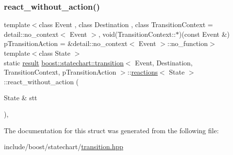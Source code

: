 \subsubsection{\texorpdfstring{react\+\_\+without\+\_\+action()}{react\_without\_action()}}
{\footnotesize\ttfamily template$<$class Event , class Destination , class Transition\+Context  = detail\+::no\+\_\+context$<$ Event $>$, void(\+Transition\+Context\+::$\ast$)(const Event \&) p\+Transition\+Action = \&detail\+::no\+\_\+context$<$ Event $>$\+::no\+\_\+function$>$ \\
template$<$class State $>$ \\
static \mbox{\hyperlink{namespaceboost_1_1statechart_abe807f6598b614d6d87bb951ecd92331}{result}} \mbox{\hyperlink{classboost_1_1statechart_1_1transition}{boost\+::statechart\+::transition}}$<$ Event, Destination, Transition\+Context, p\+Transition\+Action $>$\+::\mbox{\hyperlink{structboost_1_1statechart_1_1transition_1_1reactions}{reactions}}$<$ State $>$\+::react\+\_\+without\+\_\+action (\begin{DoxyParamCaption}\item[{State \&}]{stt }\end{DoxyParamCaption})\hspace{0.3cm}{\ttfamily [inline]}, {\ttfamily [static]}}



The documentation for this struct was generated from the following file\+:\begin{DoxyCompactItemize}
\item 
include/boost/statechart/\mbox{\hyperlink{transition_8hpp}{transition.\+hpp}}\end{DoxyCompactItemize}
